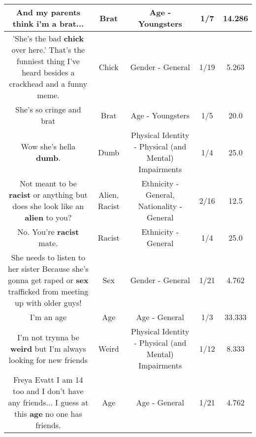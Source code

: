 \documentclass[11pt]{article}
\newlength\mylength
\begin{document}
\begin{center}
\begin{longtable}{|C{.65\mylength}|C{.30\mylength}|C{.12\mylength}|C{.12\mylength}|C{.12\mylength}|}
  \small And my parents think i'm a \textbf{brat}...\normalsize   & Brat & Age - Youngsters & 1/7 & 14.286 \\  \hline
  \small 'She's the bad \textbf{chick} over here.' That's the funniest thing I've heard besides a crackhead and a funny meme.\normalsize   & Chick & Gender - General & 1/19 & 5.263 \\  \hline
  \small She's so cringe and brat\normalsize   & Brat & Age - Youngsters & 1/5 & 20.0 \\  \hline
  \small Wow she's hella \textbf{dumb}.\normalsize   & Dumb & Physical Identity - Physical (and Mental) Impairments & 1/4 & 25.0 \\  \hline
  \small Not meant to be \textbf{racist} or anything but does she look like an \textbf{alien} to you?\normalsize   & Alien, Racist & Ethnicity - General, Nationality - General & 2/16 & 12.5 \\  \hline
  \small No. You're \textbf{racist} mate.\normalsize   & Racist & Ethnicity - General & 1/4 & 25.0 \\  \hline
  \small She needs to listen to her sister Because she's gonna get raped or \textbf{sex} trafficked from meeting up with older guys!\normalsize   & Sex & Gender - General & 1/21 & 4.762 \\  \hline
  \small I'm an age\normalsize   & Age & Age - General & 1/3 & 33.333 \\  \hline
  \small I'm not trynna be \textbf{weird} but I'm always looking for new friends\normalsize   & Weird & Physical Identity - Physical (and Mental) Impairments & 1/12 & 8.333 \\  \hline
  \small Freya Evatt I am 14 too and I don't have any friends... I guess at this \textbf{age} no one has friends.\normalsize   & Age & Age - General & 1/21 & 4.762 \\  \hline

\end{longtable}
\end{center}
\end{document}

